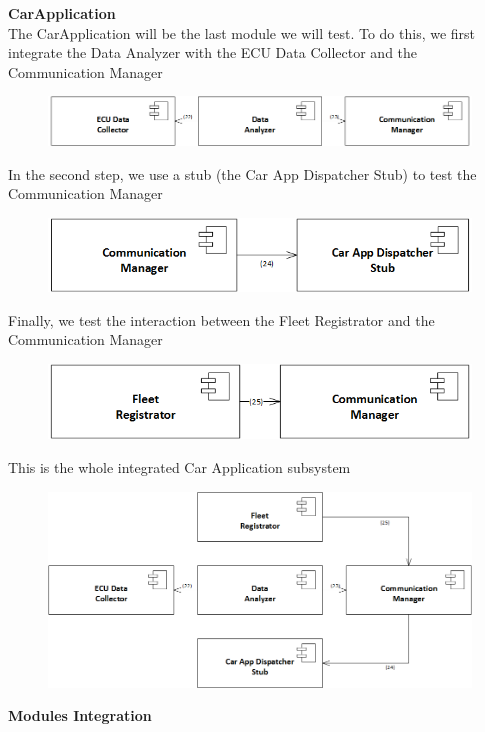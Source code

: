\documentclass{article}
\begin{document}
\textbf{CarApplication}
\\
The CarApplication will be the last module we will test. To do this, we first integrate the Data Analyzer with the ECU Data Collector and the Communication Manager
\begin{figure}[H]
\includegraphics[scale=0.5]{CarApplication/CarApplication1}
\centering
\end{figure}
In the second step, we use a stub (the Car App Dispatcher Stub) to test the Communication Manager
\begin{figure}[H]
\includegraphics[scale=0.5]{CarApplication/CarApplication2}
\centering
\end{figure}
Finally, we test the interaction between the Fleet Registrator and the Communication Manager
\begin{figure}[H]
\includegraphics[scale=0.5]{CarApplication/CarApplication3}
\centering
\end{figure}
This is the whole integrated Car Application subsystem
\begin{figure}[H]
\includegraphics[scale=0.5]{CarApplication/CarApplicationIntegration}
\centering
\end{figure}
\textbf{Modules Integration}
\end{document}
